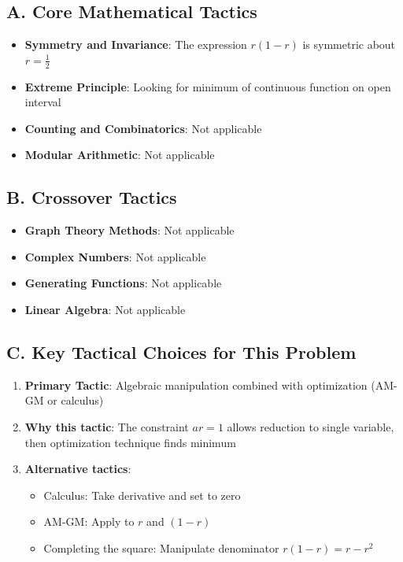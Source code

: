 \documentclass[12pt]{article}
\begin{document}
\begin{tacticalbox}
\subsection*{A. Core Mathematical Tactics}
\begin{itemize}[leftmargin=*]
    \item \textbf{Symmetry and Invariance}: The expression $r(1-r)$ is symmetric about $r = \frac{1}{2}$
    \item \textbf{Extreme Principle}: Looking for minimum of continuous function on open interval
    \item \textbf{Counting and Combinatorics}: Not applicable
    \item \textbf{Modular Arithmetic}: Not applicable
\end{itemize}

\subsection*{B. Crossover Tactics}
\begin{itemize}[leftmargin=*]
    \item \textbf{Graph Theory Methods}: Not applicable
    \item \textbf{Complex Numbers}: Not applicable
    \item \textbf{Generating Functions}: Not applicable
    \item \textbf{Linear Algebra}: Not applicable
\end{itemize}

\subsection*{C. Key Tactical Choices for This Problem}
\begin{enumerate}[leftmargin=*]
    \item \textbf{Primary Tactic}: Algebraic manipulation combined with optimization (AM-GM or calculus)
    \item \textbf{Why this tactic}: The constraint $ar=1$ allows reduction to single variable, then optimization technique finds minimum
    \item \textbf{Alternative tactics}: 
    \begin{itemize}
        \item Calculus: Take derivative and set to zero
        \item AM-GM: Apply to $r$ and $(1-r)$
        \item Completing the square: Manipulate denominator $r(1-r) = r - r^2$
    \end{itemize}
\end{enumerate}
\end{tacticalbox}
\end{document}
